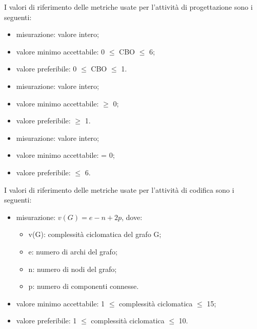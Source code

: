 		I valori di riferimento delle metriche usate per l'attività di progettazione sono i seguenti:
		
				\begin{itemize}
					\item{misurazione: valore intero;}
					\item{valore minimo accettabile: 0 $\leq$ CBO $\leq$ 6;}
					\item{valore preferibile: 0 $\leq$ CBO $\leq$ 1.}
				\end{itemize}

		
				\begin{itemize}
					\item{misurazione: valore intero;}
					\item{valore minimo accettabile: $\geq$ 0;}
					\item{valore preferibile: $\geq$ 1.}
				\end{itemize}
	
				\begin{itemize}
					\item{misurazione: valore intero;}
					\item{valore minimo accettabile: = 0;}
					\item{valore preferibile: $\leq$ 6.}
				\end{itemize}
		
		I valori di riferimento delle metriche usate per l'attività di codifica sono i seguenti:
					
			\begin{itemize}
				\item{misurazione: $v(G) = e - n + 2p$, dove: 
				\begin{itemize}
					\item{v(G)}: complessità ciclomatica del grafo G; 
					\item{e}: numero di archi del grafo; 
					\item{n}: numero di nodi del grafo; 
					\item{p}: numero di componenti connesse. 
				\end{itemize} }
				\item{valore minimo accettabile: 1 $\leq$ complessità ciclomatica $\leq$ 15;}
				\item{valore preferibile: 1 $\leq$ complessità ciclomatica $\leq$ 10.}
			\end{itemize}
			
